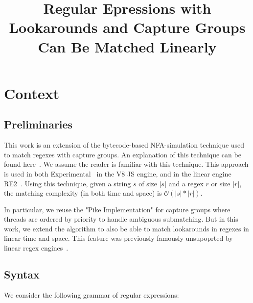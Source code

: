\documentclass{article}
\title{Regular Epressions with Lookarounds and Capture Groups Can Be Matched Linearly}
\author{}
\date{}
\renewcommand\cite\citep
\def\size#1{\ensuremath{|#1|}}
\def\bigo{\ensuremath{\mathcal{O}}}
\begin{document}
\maketitle


\section{Context}

\subsection{Preliminaries}
This work is an extension of the bytecode-based NFA-simulation technique used to match regexes with capture groups.
An explanation of this technique can be found here~\cite{regex_vm_approach}. We assume the reader is familiar with this technique.
This approach is used in both Experimental~\cite{experimental} in the V8 JS engine, and in the linear engine RE2~\cite{re2}.
Using this technique, given a string $s$ of size $\size{s}$ and a regex $r$ or size $\size{r}$, the matching complexity (in both time and space) is $\bigo(\size{s}*\size{r})$.

In particular, we reuse the "Pike Implementation" for capture groups where threads are ordered by priority to handle ambiguous submatching.
But in this work, we extend the algorithm to also be able to match lookarounds in regexes in linear time and space.
This feature was previously famously unsupoprted by linear regex engines~\cite{re2_unsupported}.


\subsection{Syntax}
We consider the following grammar of regular expressions:

\def\re{\ensuremath{\mathit{e}}}
\def\char{\ensuremath{\mathit{c}}}
\def\quant{\ensuremath{\mathit{q}}}
\def\look{\ensuremath{\mathit{lk}}}
\end{document}
